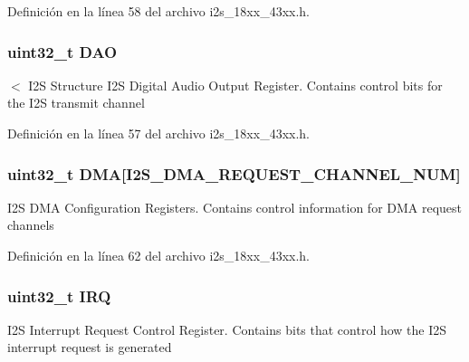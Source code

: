 Definición en la línea 58 del archivo i2s\+\_\+18xx\+\_\+43xx.\+h.

\subsubsection[{\texorpdfstring{D\+AO}{DAO}}]{ uint32\+\_\+t D\+AO}\hypertarget{struct_l_p_c___i2_s___t_ab2642f94f4e47c8fa2ce148e2741d070}{}\label{struct_l_p_c___i2_s___t_ab2642f94f4e47c8fa2ce148e2741d070}
$<$ I2S Structure I2S Digital Audio Output Register. Contains control bits for the I2S transmit channel 

Definición en la línea 57 del archivo i2s\+\_\+18xx\+\_\+43xx.\+h.

\subsubsection[{\texorpdfstring{D\+MA}{DMA}}]{ uint32\+\_\+t D\+MA\mbox{[}{\bf I2\+S\+\_\+\+D\+M\+A\+\_\+\+R\+E\+Q\+U\+E\+S\+T\+\_\+\+C\+H\+A\+N\+N\+E\+L\+\_\+\+N\+UM}\mbox{]}}\hypertarget{struct_l_p_c___i2_s___t_a1cc9b28bd861dbde0b65743b406f1977}{}\label{struct_l_p_c___i2_s___t_a1cc9b28bd861dbde0b65743b406f1977}
I2S D\+MA Configuration Registers. Contains control information for D\+MA request channels 

Definición en la línea 62 del archivo i2s\+\_\+18xx\+\_\+43xx.\+h.

\subsubsection[{\texorpdfstring{I\+RQ}{IRQ}}]{ uint32\+\_\+t I\+RQ}\hypertarget{struct_l_p_c___i2_s___t_a2f731d3cfedec4a4e11aa90b19784633}{}\label{struct_l_p_c___i2_s___t_a2f731d3cfedec4a4e11aa90b19784633}
I2S Interrupt Request Control Register. Contains bits that control how the I2S interrupt request is generated 


